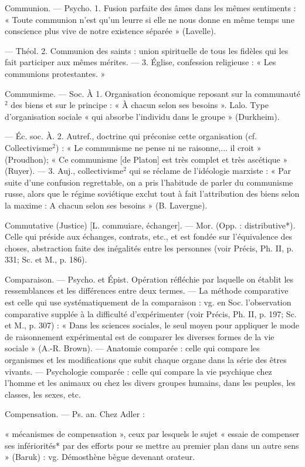 Communion. — Psycho. 1. Fusion parfaite des âmes dans les mêmes sentiments : « Toute communion n’est
qu’un leurre si elle ne nous donne en
même temps une conscience plus
vive de notre existence séparée »
(Lavelle).

— Théol. 2. Communion des
saints : union spirituelle de tous les
fidèles qui les fait participer aux
mêmes mérites. — 3. Église, confession religieuse : « Les communions
protestantes. »

Communisme. — Soc. À 1. Organisation économique reposant sur la
communauté$^2$ des biens et sur le
principe : « À chacun selon ses besoins ». Lalo. Type d'organisation
sociale « qui absorbe l’individu dans
le groupe » (Durkheim).

— Éc. soc. À. 2. Autref., doctrine
qui préconise cette organisation (cf.
Collectivisme$^2$) : « Le communisme
ne pense ni ne raisonne,... il croit »
(Proudhon); « Ce communisme [de
Platon] est très complet et très ascétique » (Ruyer). — 3. Auj., collectivisme$^2$ qui se réclame de l’idéologie marxiste : « Par suite d’une
confusion regrettable, on a pris
l'habitude de parler du communisme russe, alors que le régime
soviétique exclut tout à fait l’attribution des biens selon la maxime :
A chacun selon ses besoins » (B. Lavergne).

Commutative (Justice) [L. commuiare,
échanger]. — Mor. (Opp. : distributive*). Celle qui préside aux échanges,
contrats, etc., et est fondée sur
l'équivalence des choses, abstraction faite des inégalités entre les
personnes (voir Précis, Ph. II,
p. 331; Sc. et M., p. 186).

Comparaison. — Psycho. et Épist.
Opération réfléchie par laquelle on
établit les ressemblances et les différences entre deux termes. — La méthode comparative est celle qui use
systématiquement de la comparaison : vg. en Soc. l'observation comparative supplée à la difficulté
d’expérimenter (voir Précis, Ph. II,
p. 197; Sc. et M., p. 307) : « Dans les
sciences sociales, le seul moyen pour
appliquer le mode de raisonnement
expérimental est de comparer les
diverses formes de la vie sociale »
(A.-R. Brown). — Anatomie comparée : celle qui compare les organismes et les modifications que
subit chaque organe dans la série
des êtres vivants. — Psychologie
comparée : celle qui compare la vie
psychique chez l’homme et les animaux ou chez les divers groupes
humains, dans les peuples, les
classes, les sexes, etc.

Compensation. — Ps. an. Chez Adler :

« mécanismes de compensation »,
ceux par lesquels le sujet « essaie de
compenser ses infériorités* par des
efforts pour se mettre au premier
plan dans un autre sens » (Baruk) :
vg. Démosthène bègue devenant
orateur.

